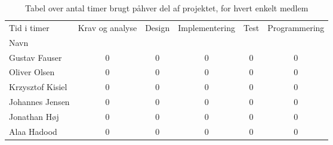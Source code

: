 \begin{table}[H]
\begin{tabular}{lccccc}
\hline
\multicolumn{1}{|l|}{Tid i timer} & Krav og analyse & \multicolumn{1}{l}{Design} & Implementering & Test & Programmering \\ \cline{2-6} 
\multicolumn{1}{|l|}{Navn} &  & \multicolumn{1}{l}{} &  &  &  \\ \cline{1-1}
Gustav Fauser &0&0& 0 &0 &  0  \\
Oliver Olsen & 0& 0 &0 & 0 & 0 \\
Krzysztof Kisiel & 0 & 0 & 0 & 0 & 0  \\
Johannes Jensen & 0 & 0 & 0 & 0 & 0 \\
Jonathan H\o j & 0 & 0 & 0 & 0 & 0 \\
Alaa Hadood & 0 & 0 & 0 & 0 & 0 \\ \hline
\end{tabular}
\caption{Tabel over antal timer brugt p\aa \space hver del af projektet, for hvert enkelt medlem}
\label{table:timeplan}
\end{table}

